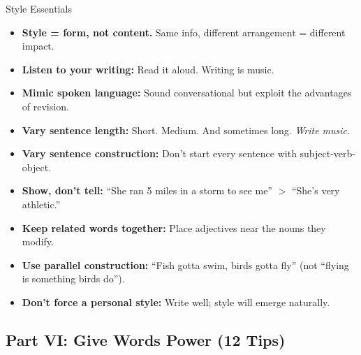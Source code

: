 \documentclass[12pt,a4paper]{article}
\begin{document}
\begin{keybox}{Style Essentials}
\begin{itemize}[noitemsep]
    \item \textbf{Style = form, not content.} Same info, different arrangement = different impact.
    \item \textbf{Listen to your writing:} Read it aloud. Writing is music.
    \item \textbf{Mimic spoken language:} Sound conversational but exploit the advantages of revision.
    \item \textbf{Vary sentence length:} Short. Medium. And sometimes long. \textit{Write music.}
    \item \textbf{Vary sentence construction:} Don't start every sentence with subject-verb-object.
    \item \textbf{Show, don't tell:} ``She ran 5 miles in a storm to see me'' $>$ ``She's very athletic.''
    \item \textbf{Keep related words together:} Place adjectives near the nouns they modify.
    \item \textbf{Use parallel construction:}  ``Fish gotta swim, birds gotta fly'' (not ``flying is something birds do'').
    \item \textbf{Don't force a personal style:} Write well; style will emerge naturally.
\end{itemize}
\end{keybox}

\subsection{Part VI: Give Words Power (12 Tips)}
\end{document}
